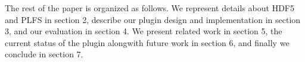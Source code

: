 The rest of the paper is organized as follows. We represent details about HDF5 and PLFS in section 2, describe our plugin design and implementation in section 3, and our evaluation in section 4. We present related work in section 5, the current status of the plugin alongwith future work in section 6, and finally we conclude in section 7.

